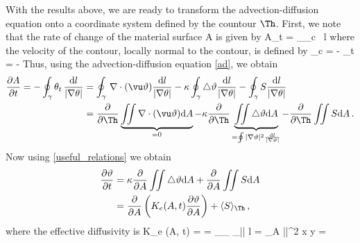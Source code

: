 \documentclass[11pt]{article}
\begin{document}
With the results above, we are ready to transform the advection-diffusion equation onto a coordinate system defined by the countour $\Th$. First, we note that the rate of change of the  material surface A is given by
\beq
A_t =  \oint_\gamma \vu_c \cdot \hat{\vn} \, \dd l\com
\eeq
where the velocity of the contour, locally normal to the contour, is defined by
\beq
\vu_c = - \theta_t  = -  \hat{\vn}\per
\eeq
Thus, using the advection-diffusion equation \eqref{ad}, we obtain
\begin{align}
\frac{\p A}{\p t} =  - \oint_\gamma \theta_t \, \frac{\dd l}{{|\nabla \theta|}} &= 
                       \oint_\gamma \, \nabla \cdot (\vu \vth) \frac{\dd l}{{|\nabla \theta|}} 
                      - \kappa \oint_\gamma \lap \vth   \frac{\dd l}{{|\nabla \theta|}} 
                      - \oint_\gamma S  \frac{\dd l}{{|\nabla \theta|}}\nonumber \\
                     & =  \frac{\p}{\p \Th}\underbrace{\iint \nabla \cdot (\vu \vth) \dd A}_{=0}
                        -  \kappa  \frac{\p}{\p \Th}\underbrace{\iint \lap \vth \dd A}_{=\oint |\nabla\vth|^2\frac{\dd l}{|\nabla \vth|}}
                        -  \frac{\p}{\p \Th}\iint S  \dd A  \per
\end{align}
Now using \eqref{useful_relations} we obtain
\begin{align}
\frac{\p \vth}{\p t} &= \kappa \frac{\p}{\p A} \iint \lap \vth \dd A + \frac{\p }{\p A} \iint S  \dd A \nonumber\\
                     &= \frac{\p}{\p A}\left(K_{e}(A,t) \frac{\p \vth}{\p A}\right) + \langle S \rangle_\Th\com
\end{align}
where the effective diffusivity  is
\beq
\label{KeDefn}
K_e (A, t) =   
        =  \kappa  {}_{\oint_\gamma {}} \oint_\gamma |\nabla\vth| \dd l 
        =  \iint_{\p A}  \kappa  |\nabla\vth|^2 \dd x \dd y = 
         \per
\eeq
\end{document}
